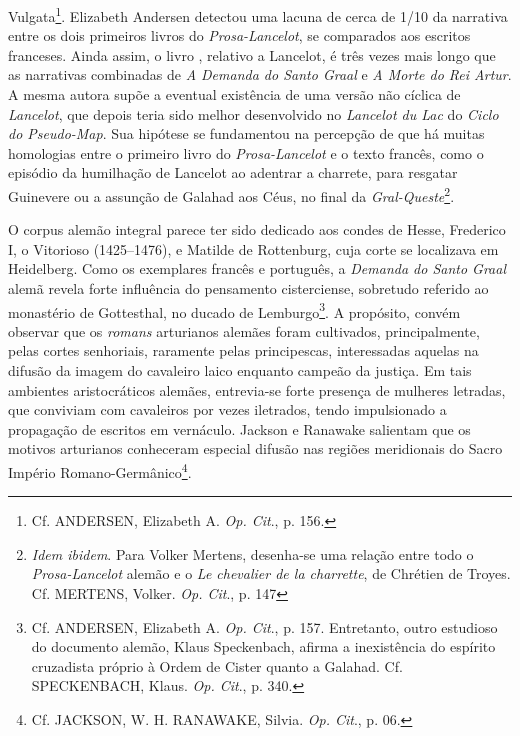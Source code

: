 Vulgata\footnote{ Cf. ANDERSEN, Elizabeth A. \textit{Op. Cit}., p. 156. }.
Elizabeth Andersen detectou uma lacuna de cerca de 1/10 da narrativa entre os
dois primeiros livros do \textit{Prosa-Lancelot}, se comparados aos escritos
franceses. Ainda assim, o livro , relativo a Lancelot, é três vezes mais longo
que as narrativas combinadas de \textit{A Demanda do Santo Graal }e \textit{A
Morte do Rei Artur}. A mesma autora supõe a eventual existência de uma versão
não cíclica de \textit{Lancelot}, que depois teria sido melhor desenvolvido no
\textit{Lancelot du Lac} do \textit{Ciclo do Pseudo-Map}. Sua hipótese se
fundamentou na percepção de que há muitas homologias entre o primeiro livro do
\textit{Prosa-Lancelot} e o texto francês, como o episódio da humilhação de
Lancelot ao adentrar a charrete, para resgatar Guinevere ou a assunção de
Galahad aos Céus, no final da \textit{Gral-Queste}\footnote{ \textit{Idem
ibidem}. Para Volker Mertens, desenha-se uma relação entre todo o
\textit{Prosa-Lancelot} alemão e o \textit{Le chevalier de la charrette}, de
Chrétien de Troyes. Cf. MERTENS, Volker. \textit{Op. Cit}., p. 147}. 

O corpus alemão integral parece ter sido dedicado aos condes de Hesse, Frederico
I, o Vitorioso (1425--1476), e Matilde de Rottenburg, cuja corte se localizava
em Heidelberg. Como os exemplares francês e português, a \textit{Demanda do
Santo Graal} alemã revela forte influência do pensamento cisterciense,
sobretudo referido ao monastério de Gottesthal, no ducado de Lemburgo\footnote{
Cf. ANDERSEN, Elizabeth A. \textit{Op. Cit}., p. 157. Entretanto, outro
estudioso do documento alemão, Klaus Speckenbach, afirma a inexistência do
espírito cruzadista próprio à Ordem de Cister quanto a Galahad. Cf.
SPECKENBACH, Klaus. \textit{Op. Cit}., p. 340. }. A propósito, convém observar
que os \textit{romans} arturianos alemães foram cultivados, principalmente,
pelas cortes senhoriais, raramente pelas principescas, interessadas aquelas na
difusão da imagem do cavaleiro laico enquanto campeão da justiça. Em tais
ambientes aristocráticos alemães, entrevia-se forte presença de mulheres
letradas, que conviviam com cavaleiros por vezes iletrados, tendo impulsionado
a propagação de escritos em vernáculo. Jackson e Ranawake salientam que os
motivos arturianos conheceram especial difusão nas regiões meridionais do Sacro
Império Romano-Germânico\footnote{ Cf. JACKSON, W. H. RANAWAKE, Silvia.
\textit{Op. Cit}., p. 06. }. 

